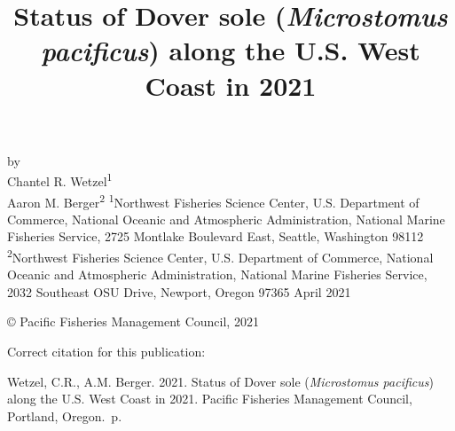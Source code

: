 \documentclass[11pt,
  english,
  a4paper,
]{article}
\date{}
\newcommand{\trTitle}{Status of Dover sole (\emph{Microstomus pacificus}) along the U.S. West Coast in 2021}
\newcommand{\trYear}{2021}
\newcommand{\trMonth}{April}
\newcommand{\trAuthsBack}{Wetzel, C.R., A.M. Berger}
\newcommand{\trCitation}{
\begin{hangparas}{1em}{1}
\trAuthsBack{}. \trYear{}. \trTitle{}. Pacific Fisheries Management Council, Portland, Oregon. \pageref{LastPage}{}\,p.
\end{hangparas}}
\begin{document}

\renewcommand*{\thefootnote}{\fnsymbol{footnote}}

\small
\thispagestyle{empty}
\noindent
\begin{center}
\title{Status of Dover sole (\emph{Microstomus pacificus}) along the U.S. West Coast in 2021}
\vspace{1.5cm}
{\Large\textbf{}}
\vfill
by\\
Chantel R. Wetzel\textsuperscript{1}\\
Aaron M. Berger\textsuperscript{2}\vfill
\textsuperscript{1}Northwest Fisheries Science Center, U.S. Department of Commerce, National Oceanic and Atmospheric Administration, National Marine Fisheries Service, 2725 Montlake Boulevard East, Seattle, Washington 98112\\
\textsuperscript{2}Northwest Fisheries Science Center, U.S. Department of Commerce, National Oceanic and Atmospheric Administration, National Marine Fisheries Service, 2032 Southeast OSU Drive, Newport, Oregon 97365\vfill
\trMonth{} \trYear{}
\end{center}
\clearpage

\thispagestyle{empty}
\vspace*{\fill}
\begin{center}
\copyright{} Pacific Fisheries Management Council, \trYear{}\\
\end{center}
\par
\bigskip
\noindent
Correct citation for this publication:
\bigskip
\par
\trCitation{}
\clearpage


\tableofcontents\clearpage
\label{TRlastRoman}
\clearpage

\newpage
\thispagestyle{empty} %

\pagestyle{plain}  %
\renewcommand*{\thefootnote}{\arabic{footnote}}  %
\setcounter{footnote}{0}  %
\renewcommand{\headrulewidth}{0.5pt}
\renewcommand{\footrulewidth}{0.5pt}
\end{document}
